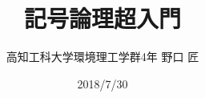 \documentclass[a5j,11pt,uplatex,dvipdfmx]{jsbook}
\theoremstyle{mystyle} %
\renewcommand{\thesection}{{\S} \arabic{chapter}.\arabic{section}}
\renewcommand{\thefigure}{\arabic{chapter}.\arabic{figure}}
\renewcommand{\thetable}{\arabic{chapter}.\arabic{table}}
\renewcommand{\theequation}
  {\arabic{chapter}.\arabic{section}.\arabic{equation}}
\begin{document}
%
%
%
 \begin{titlepage} %
   \title{記号論理超入門}
  \author{高知工科大学環境理工学群4年 野口 匠}
  \date{2018/7/30}
 \maketitle
 \thispagestyle{empty}
 \end{titlepage}
%
%
\frontmatter %
 \tableofcontents %
%
%
\mainmatter %
%
%
%
%
\appendix %
%
\makeatletter
 \renewcommand{\theequation}
  {\Alph{chapter}.\arabic{section}.\arabic{equation}}
\makeatother
 \renewcommand{\thesection}{\S \  \Alph{chapter}.\arabic{section}}
 \renewcommand{\thefigure}{\Alph{chapter}.\arabic{section}.\arabic{figure}} %
 \renewcommand{\thetable}{\Alph{chapter}.\arabic{section}.\arabic{table}} %
%
%
%
%
%
%
\backmatter
{\small
    }
%
{\footnotesize
\printindex[nidx] %
\printindex[widx] %
}
%
%
\end{document}
